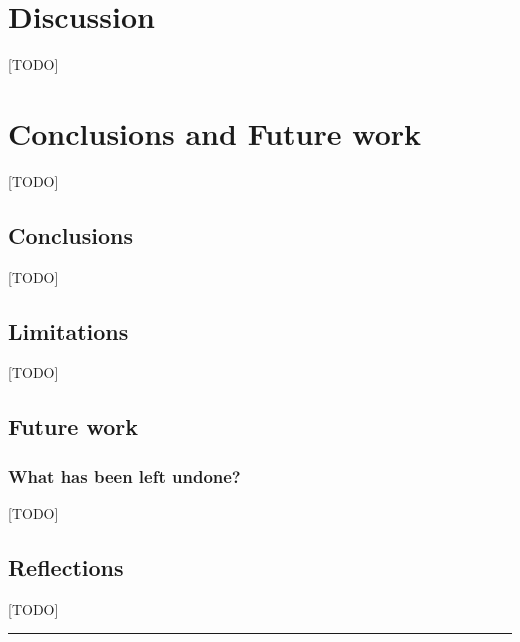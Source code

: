\chapter{Discussion} \label{ch:discussion}
[TODO]

\cleardoublepage
\chapter{Conclusions and Future work} \label{ch:conclusionsAndFutureWork}
[TODO]

\section{Conclusions} \label{sec:conclusions}

[TODO]

\section{Limitations}
[TODO]

\section{Future work} \label{sec:futureWork}

\subsection{What has been left undone?} \label{what-has-been-left-undone}
[TODO]

\section{Reflections} \label{sec:reflections}
[TODO]

\noindent\rule{\textwidth}{0.4mm}